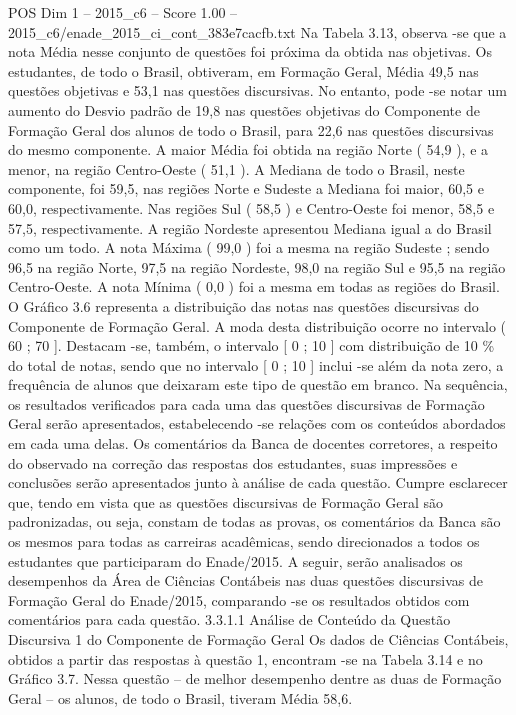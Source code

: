 \begin{textsample}{POS Dim 1 – 2015\_c6 – Score 1.00 – 2015\_c6/enade\_2015\_ci\_cont\_383e7cacfb.txt}
Na Tabela 3.13, observa -se que a nota Média nesse conjunto de questões foi próxima da obtida nas objetivas.
Os estudantes, de todo o Brasil, obtiveram, em Formação Geral, Média 49,5 nas questões objetivas e 53,1 nas questões discursivas.
No entanto, pode -se notar um aumento do Desvio padrão de 19,8 nas questões objetivas do Componente de Formação Geral dos alunos de todo o Brasil, para 22,6 nas questões discursivas do mesmo componente.
A maior Média foi obtida na região Norte ( 54,9 ), e a menor, na região Centro-Oeste ( 51,1 ).
A Mediana de todo o Brasil, neste componente, foi 59,5, nas regiões Norte e Sudeste a Mediana foi maior, 60,5 e 60,0, respectivamente.
Nas regiões Sul ( 58,5 ) e Centro-Oeste foi menor, 58,5 e 57,5, respectivamente.
A região Nordeste apresentou Mediana igual a do Brasil como um todo.
A nota Máxima ( 99,0 ) foi a mesma na região Sudeste ; sendo 96,5 na região Norte, 97,5 na região Nordeste, 98,0 na região Sul e 95,5 na região Centro-Oeste.
A nota Mínima ( 0,0 ) foi a mesma em todas as regiões do Brasil.
O Gráfico 3.6 representa a distribuição das notas nas questões discursivas do Componente de Formação Geral.
A moda desta distribuição ocorre no intervalo ( 60 ; 70 ].
Destacam -se, também, o intervalo [ 0 ; 10 ] com distribuição de 10 \% do total de notas, sendo que no intervalo [ 0 ; 10 ] inclui -se além da nota zero, a frequência de alunos que deixaram este tipo de questão em branco.
Na sequência, os resultados verificados para cada uma das questões discursivas de Formação Geral serão apresentados, estabelecendo -se relações com os conteúdos abordados em cada uma delas.
Os comentários da Banca de docentes corretores, a respeito do observado na correção das respostas dos estudantes, suas impressões e conclusões serão apresentados junto à análise de cada questão.
Cumpre esclarecer que, tendo em vista que as questões discursivas de Formação Geral são padronizadas, ou seja, constam de todas as provas, os comentários da Banca são os mesmos para todas as carreiras acadêmicas, sendo direcionados a todos os estudantes que participaram do Enade/2015.
A seguir, serão analisados os desempenhos da Área de Ciências Contábeis nas duas questões discursivas de Formação Geral do Enade/2015, comparando -se os resultados obtidos com comentários para cada questão. 3.3.1.1 Análise de Conteúdo da Questão Discursiva 1 do Componente de Formação Geral Os dados de Ciências Contábeis, obtidos a partir das respostas à questão 1, encontram -se na Tabela 3.14 e no Gráfico 3.7.
Nessa questão – de melhor desempenho dentre as duas de Formação Geral – os alunos, de todo o Brasil, tiveram Média 58,6.

\end{textsample}
